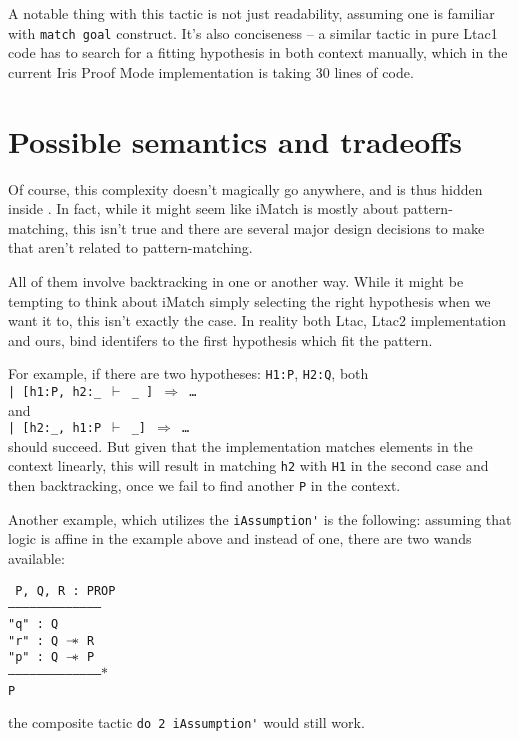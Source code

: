 A notable thing with this tactic is not just readability, assuming one is familiar with \verb|match goal| construct.
It's also conciseness -- a similar tactic in pure Ltac1 code has to search for a fitting hypothesis in both context manually, which in the current Iris Proof Mode implementation is taking 30 lines of code.

\section{Possible semantics and tradeoffs}

Of course, this complexity doesn't magically go anywhere, and is thus hidden inside \iMatch.
In fact, while it might seem like iMatch is mostly about pattern-matching, this isn't true and there are several major design decisions to make that aren't related to pattern-matching.

All of them involve backtracking in one or another way.
While it might be tempting to think about iMatch simply selecting the right hypothesis when we want it to, this isn't exactly the case.
In reality both Ltac, Ltac2 implementation and ours, bind identifers to the first hypothesis which fit the pattern.

For example, if there are two hypotheses: \verb|H1:P|, \verb|H2:Q|,
both\\
\texttt{| [h1:P, h2:\_ $\vdash$ \_ ] $\Rightarrow$ \ldots}\\
and\\
\texttt{| [h2:\_, h1:P $\vdash$ \_] $\Rightarrow$ \ldots}\\
should succeed.
But given that the implementation matches elements in the context linearly, this will result in matching \verb|h2| with \verb|H1| in the second case and then backtracking, once we fail to find another \verb|P| in the context.

Another example, which utilizes the \verb|iAssumption'| is the following: assuming that logic is affine in the example above and instead of one, there are two wands available:

\texttt{
P, Q, R : PROP\\
---------------------------------------\\
"q" : Q\\
"r" : Q $\mathrel{-\mkern-6mu*}$ R\\
"p" : Q $\mathrel{-\mkern-6mu*}$ P\\
--------------------------------------$\ast$\\
P
}

the composite tactic \verb|do 2 iAssumption'| would still work.

